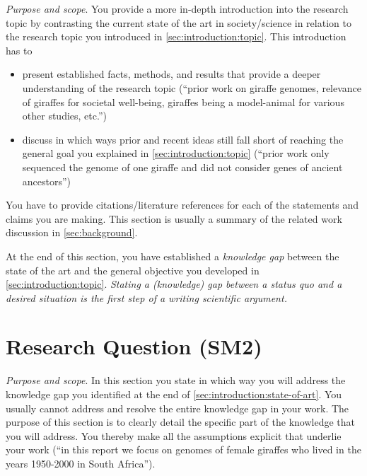\emph{Purpose and scope}.
You provide a more in-depth introduction into the research topic by contrasting the current state of the art in society/science in relation to the research topic you introduced in \cref{sec:introduction:topic}.
This introduction has to

\begin{itemize}
  \item present established facts, methods, and results that provide a deeper understanding of the research topic (``prior work on giraffe genomes, relevance of giraffes for societal well-being, giraffes being a model-animal for various other studies, etc.'')
  \item discuss in which ways prior and recent ideas still fall short of reaching the general goal you explained in \cref{sec:introduction:topic} (``prior work only sequenced the genome of one giraffe and did not consider genes of ancient ancestors'')
\end{itemize}

You have to provide citations/literature references for each of the statements and claims you are making.
This section is usually a summary of the related work discussion in \cref{sec:background}.

At the end of this section, you have established a \emph{knowledge gap} between the state of the art and the general objective you developed in \cref{sec:introduction:topic}.
\emph{Stating a (knowledge) gap between a status quo and a desired situation is the \emph{first step} of a writing scientific argument.}

\section{Research Question (SM2)}\label{sec:introduction:research-question}

\emph{Purpose and scope}.
In this section you state in which way you will address the knowledge gap you identified at the end of \cref{sec:introduction:state-of-art}.
You usually cannot address and resolve the entire knowledge gap in your work.
The purpose of this section is to clearly detail the specific part of the knowledge that you will address.
You thereby make all the assumptions explicit that underlie your work (``in this report we focus on genomes of female giraffes who lived in the years 1950-2000 in South Africa'').

